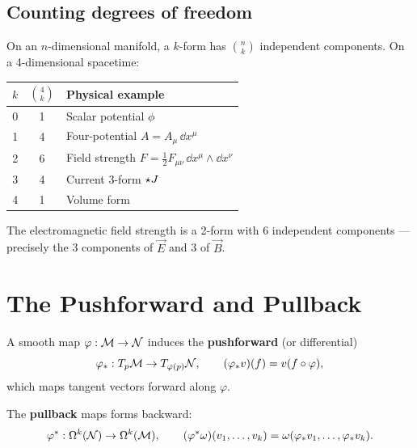 \subsection{Counting degrees of freedom}

On an $n$-dimensional manifold, a $k$-form has $\binom{n}{k}$ independent components. On a 4-dimensional spacetime:

\begin{table}[h]
\centering
\begin{tabular}{ccl}
\toprule
$k$ & $\binom{4}{k}$ & \textbf{Physical example} \\
\midrule
0 & 1 & Scalar potential $\phi$ \\
1 & 4 & Four-potential $A = A_\mu\,\dd x^\mu$ \\
2 & 6 & Field strength $F = \tfrac{1}{2}F_{\mu\nu}\,\dd x^\mu \wedge \dd x^\nu$ \\
3 & 4 & Current 3-form $\star J$ \\
4 & 1 & Volume form \\
\bottomrule
\end{tabular}
\end{table}

The electromagnetic field strength is a 2-form with 6 independent components --- precisely the 3 components of $\vec{E}$ and 3 of $\vec{B}$.

\section{The Pushforward and Pullback}

\begin{definition}[Pushforward]
A smooth map $\varphi: \mathcal{M} \to \mathcal{N}$ induces the \textbf{pushforward} (or differential)
\begin{equation}
\varphi_*: T_p\mathcal{M} \to T_{\varphi(p)}\mathcal{N}, \qquad (\varphi_* v)(f) = v(f \circ \varphi),
\end{equation}
which maps tangent vectors forward along $\varphi$.
\end{definition}

\begin{definition}[Pullback]
The \textbf{pullback} maps forms backward:
\begin{equation}
\varphi^*: \Omega^k(\mathcal{N}) \to \Omega^k(\mathcal{M}), \qquad (\varphi^*\omega)(v_1, \ldots, v_k) = \omega(\varphi_* v_1, \ldots, \varphi_* v_k).
\end{equation}
\end{definition}

